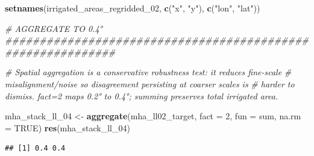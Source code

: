 \documentclass[
  11pt,
]{article}
\newenvironment{Shaded}{\begin{snugshade}}{\end{snugshade}}
\newcommand{\AttributeTok}[1]{\textcolor[rgb]{0.13,0.29,0.53}{#1}}
\newcommand{\CommentTok}[1]{\textcolor[rgb]{0.56,0.35,0.01}{\textit{#1}}}
\newcommand{\ConstantTok}[1]{\textcolor[rgb]{0.56,0.35,0.01}{#1}}
\newcommand{\DecValTok}[1]{\textcolor[rgb]{0.00,0.00,0.81}{#1}}
\newcommand{\FunctionTok}[1]{\textcolor[rgb]{0.13,0.29,0.53}{\textbf{#1}}}
\newcommand{\NormalTok}[1]{#1}
\newcommand{\OtherTok}[1]{\textcolor[rgb]{0.56,0.35,0.01}{#1}}
\newcommand{\StringTok}[1]{\textcolor[rgb]{0.31,0.60,0.02}{#1}}
\begin{document}
\begin{Shaded}
\begin{Highlighting}[]
\FunctionTok{setnames}\NormalTok{(irrigated\_areas\_regridded\_02, }\FunctionTok{c}\NormalTok{(}\StringTok{"x"}\NormalTok{, }\StringTok{"y"}\NormalTok{), }\FunctionTok{c}\NormalTok{(}\StringTok{"lon"}\NormalTok{, }\StringTok{"lat"}\NormalTok{))}


\CommentTok{\# AGGREGATE TO 0.4° \#\#\#\#\#\#\#\#\#\#\#\#\#\#\#\#\#\#\#\#\#\#\#\#\#\#\#\#\#\#\#\#\#\#\#\#\#\#\#\#\#\#\#\#\#\#\#\#\#\#\#\#\#\#\#\#\#\#\#\#}

\CommentTok{\# Spatial aggregation is a conservative robustness test: it reduces fine{-}scale}
\CommentTok{\# misalignment/noise so disagreement persisting at coarser scales is }
\CommentTok{\# harder to dismiss. fact=2 maps 0.2° to 0.4°; summing preserves total irrigated area.}

\NormalTok{mha\_stack\_ll\_04 }\OtherTok{\textless{}{-}} \FunctionTok{aggregate}\NormalTok{(mha\_ll02\_target, }\AttributeTok{fact =} \DecValTok{2}\NormalTok{, }\AttributeTok{fun =}\NormalTok{ sum, }\AttributeTok{na.rm =} \ConstantTok{TRUE}\NormalTok{)}
\FunctionTok{res}\NormalTok{(mha\_stack\_ll\_04)}
\end{Highlighting}
\end{Shaded}

\begin{verbatim}
## [1] 0.4 0.4
\end{verbatim}
\end{document}
